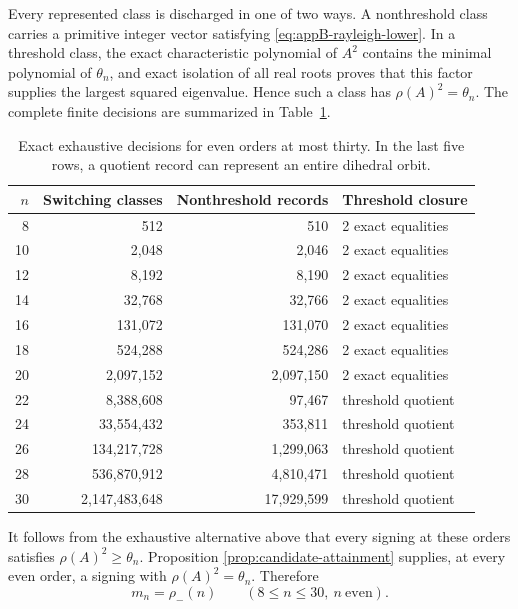 Every represented class is discharged in one of two ways.  A nonthreshold
class carries a primitive integer vector satisfying
\eqref{eq:appB-rayleigh-lower}.  In a threshold class, the exact
characteristic polynomial of \(A^2\) contains the minimal polynomial of
\(\theta_n\), and exact isolation of all real roots proves that this factor
supplies the largest squared eigenvalue.  Hence such a class has
\(\rho(A)^2=\theta_n\).  The complete finite decisions are summarized in
Table~\ref{tab:appB-small-orders}.

\begin{table}[t]
\centering
\caption{Exact exhaustive decisions for even orders at most thirty.  In the
last five rows, a quotient record can represent an entire dihedral orbit.}
\label{tab:appB-small-orders}
\begin{tabular}{@{}r r r l@{}}
\toprule
\(n\)&Switching classes&Nonthreshold records&Threshold closure\\
\midrule
8  &512          &510       &2 exact equalities\\
10 &2,048        &2,046     &2 exact equalities\\
12 &8,192        &8,190     &2 exact equalities\\
14 &32,768       &32,766    &2 exact equalities\\
16 &131,072      &131,070   &2 exact equalities\\
18 &524,288      &524,286   &2 exact equalities\\
20 &2,097,152    &2,097,150 &2 exact equalities\\
22 &8,388,608    &97,467    &threshold quotient\\
24 &33,554,432   &353,811   &threshold quotient\\
26 &134,217,728  &1,299,063 &threshold quotient\\
28 &536,870,912  &4,810,471 &threshold quotient\\
30 &2,147,483,648&17,929,599&threshold quotient\\
\bottomrule
\end{tabular}
\end{table}

It follows from the exhaustive alternative above that every signing at these
orders satisfies \(\rho(A)^2\geq\theta_n\).  Proposition
\ref{prop:candidate-attainment} supplies, at every even order, a signing with
\(\rho(A)^2=\theta_n\).  Therefore
\begin{equation}\label{eq:appB-small-equality}
 m_n=\rho_-(n)
 \qquad(8\leq n\leq30,\ n\ \text{even}).
\end{equation}

